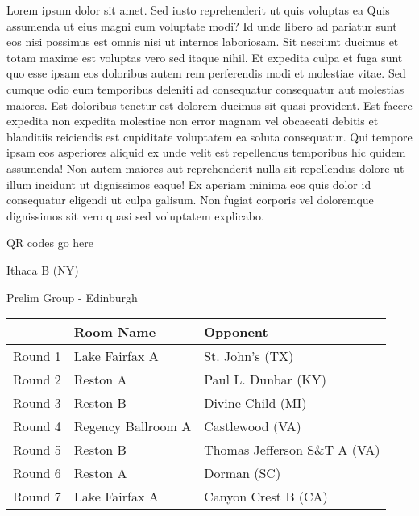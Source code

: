 \documentclass{article}%
\begin{document}
\vspace*{8pt}%
\linebreak%
\newline%
\newline%
Lorem ipsum dolor sit amet. Sed iusto reprehenderit ut quis voluptas ea Quis assumenda ut eius magni eum voluptate modi? Id unde libero ad pariatur sunt eos nisi possimus est omnis nisi ut internos laboriosam. Sit nesciunt ducimus et totam maxime est voluptas vero sed itaque nihil. Et expedita culpa et fuga sunt quo esse ipsam eos doloribus autem rem perferendis modi et molestiae vitae.\newline%
\newline%
Sed cumque odio eum temporibus deleniti ad consequatur consequatur aut molestias maiores. Est doloribus tenetur est dolorem ducimus sit quasi provident. Est facere expedita non expedita molestiae non error magnam vel obcaecati debitis et blanditiis reiciendis est cupiditate voluptatem ea soluta consequatur. Qui tempore ipsam eos asperiores aliquid ex unde velit est repellendus temporibus hic quidem assumenda!\newline%
\newline%
Non autem maiores aut reprehenderit nulla sit repellendus dolore ut illum incidunt ut dignissimos eaque! Ex aperiam minima eos quis dolor id consequatur eligendi ut culpa galisum. Non fugiat corporis vel doloremque dignissimos sit vero quasi sed voluptatem explicabo.\newline%
\newline%
%
\vspace*{30pt}%
\begin{center}%
\begin{Huge}%
QR codes go here%
\end{Huge}%
\end{center}%
\newpage%
%
\begin{center}%
\begin{Huge}%
Ithaca B (NY)%
\end{Huge}%
\vspace*{8pt}%
\linebreak%
\begin{Large}%
Prelim Group {-} Edinburgh%
\end{Large}%
\end{center}%
\begin{tabularx}{\textwidth}{|c|Y|Y|}%
\hline%
&Room Name&Opponent\\%
\hline%
Round 1&Lake Fairfax A&St. John's (TX)\\%
Round 2&Reston A&Paul L. Dunbar (KY)\\%
Round 3&Reston B&Divine Child (MI)\\%
Round 4&Regency Ballroom A&Castlewood (VA)\\%
Round 5&Reston B&Thomas Jefferson S\&T A (VA)\\%
Round 6&Reston A&Dorman (SC)\\%
Round 7&Lake Fairfax A&Canyon Crest B (CA)\\%
\hline%
\end{tabularx}%
\end{document}

